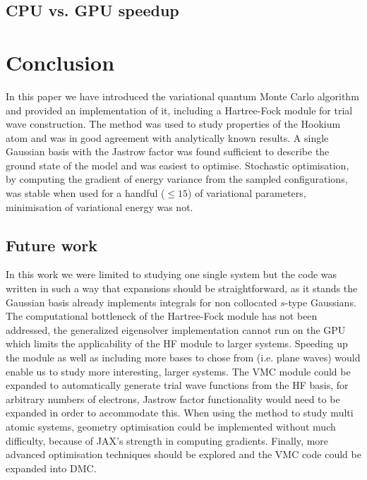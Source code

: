 \documentclass[final,3p,times,twocolumn]{elsarticle}
\begin{document}
	\subsection{CPU vs. GPU speedup}
	
	\section{Conclusion}
	\label{sec:conclusion}
	In this paper we have introduced the variational quantum Monte Carlo algorithm and provided an implementation of it, including a Hartree-Fock module for trial wave construction. The method was used to study properties of the Hookium atom and was in good agreement with analytically known results. A single Gaussian basis with the Jastrow factor was found sufficient to describe the ground state of the model and was easiest to optimise. Stochastic optimisation, by computing the gradient of energy variance from the sampled configurations, was stable when used for a handful ($\leq 15$) of variational parameters, minimisation of variational energy was not. 

	\subsection{Future work}
	In this work we were limited to studying one single system but the code was written in such a way that expansions should be straightforward, as it stands the Gaussian basis already implements integrals for non collocated $s$-type Gaussians. The computational bottleneck of the Hartree-Fock module has not been addressed, the generalized eigensolver implementation cannot run on the GPU which limits the applicability of the HF module to larger systems. Speeding up the module as well as including more bases to chose from (i.e. plane waves) would enable us to study more interesting, larger systems. 
	The VMC module could be expanded to automatically generate trial wave functions from the HF basis, for arbitrary numbers of electrons, Jastrow factor functionality would need to be expanded in order to accommodate this. When using the method to study multi atomic systems, geometry optimisation could be implemented without much difficulty, because of JAX's strength in computing gradients. Finally, more advanced optimisation techniques should be explored and the VMC code could be expanded into DMC.
	
	
	
	
	\appendix
\end{document}
